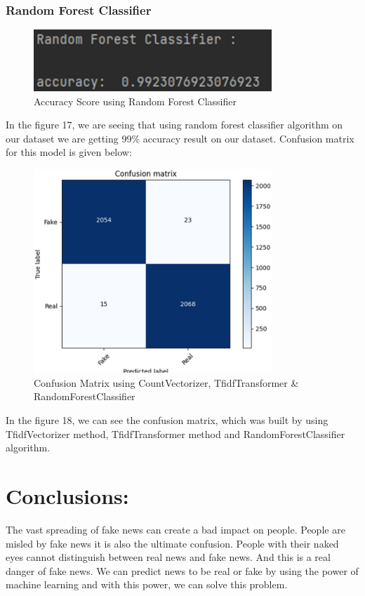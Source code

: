 \documentclass{article}
\begin{document}
    \subsubsection{Random Forest Classifier}
     \begin{figure}[!h]
    \centering
    \includegraphics[width=0.8\textwidth]{image17.png}
    \caption{Accuracy Score using Random Forest Classifier}
    \label{fig:label}
    \end{figure}\break
    In the figure 17, we are seeing that using random forest classifier algorithm on our dataset we are getting 99\% accuracy result on our dataset. Confusion matrix for this model is given below:
    \break
    \begin{figure}[!h]
    \centering
    \includegraphics[width=0.8\textwidth]{image18.png}
    \caption{Confusion Matrix using CountVectorizer, TfidfTransformer \& RandomForestClassifier}
    \label{fig:label}
    \end{figure}\break
    In the figure 18, we can see the confusion matrix, which was built by using TfidfVectorizer method, TfidfTransformer method and RandomForestClassifier algorithm.
    
    \section{Conclusions:}
    The vast spreading of fake news can create a bad impact on people.  People are misled by fake news it is also the ultimate confusion. People with their naked eyes cannot distinguish between real news and fake news. And this is a real danger of fake news. We can predict news to be real or fake by using the power of machine learning and with this power, we can solve this problem.
    
\end{document}
